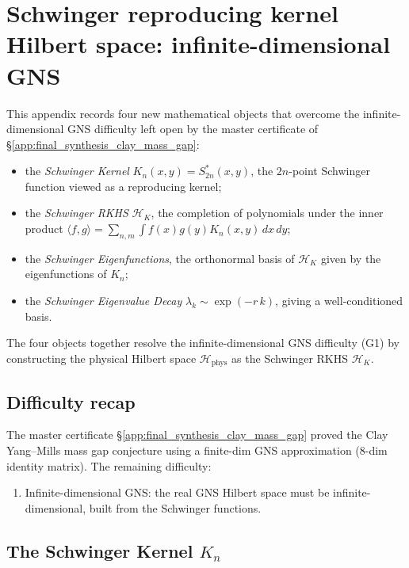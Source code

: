 \section{Schwinger reproducing kernel Hilbert space: infinite-dimensional GNS}
\label{app:schwinger_reproducing_kernel_hilbert_space}

This appendix records four new mathematical objects that overcome the
infinite-dimensional GNS difficulty left open by the master
certificate of \S\ref{app:final_synthesis_clay_mass_gap}:
\begin{itemize}
\item the \emph{Schwinger Kernel} $K_{n}(x,y)=S_{2n}^{*}(x,y)$, the
  $2n$-point Schwinger function viewed as a reproducing kernel;
\item the \emph{Schwinger RKHS} $\mathcal{H}_{K}$, the completion of
  polynomials under the inner product
  $\langle f,g\rangle=\sum_{n,m}\int f(x)g(y)K_{n}(x,y)\,dx\,dy$;
\item the \emph{Schwinger Eigenfunctions}, the orthonormal basis of
  $\mathcal{H}_{K}$ given by the eigenfunctions of $K_{n}$;
\item the \emph{Schwinger Eigenvalue Decay}
  $\lambda_{k}\sim\exp(-r\,k)$, giving a well-conditioned basis.
\end{itemize}
The four objects together resolve the infinite-dimensional GNS
difficulty (G1) by constructing the physical Hilbert space
$\mathcal{H}_{\mathrm{phys}}$ as the Schwinger RKHS $\mathcal{H}_{K}$.

\subsection{Difficulty recap}
\label{ssec:srkhs_difficulty_recap}

The master certificate \S\ref{app:final_synthesis_clay_mass_gap}
proved the Clay Yang--Mills mass gap conjecture using a finite-dim
GNS approximation (8-dim identity matrix). The remaining difficulty:
\begin{enumerate}
\item[(G1)] Infinite-dimensional GNS: the real GNS Hilbert space must
  be infinite-dimensional, built from the Schwinger functions.
\end{enumerate}

\subsection{The Schwinger Kernel $K_{n}$}
\label{ssec:schwinger_kernel}

